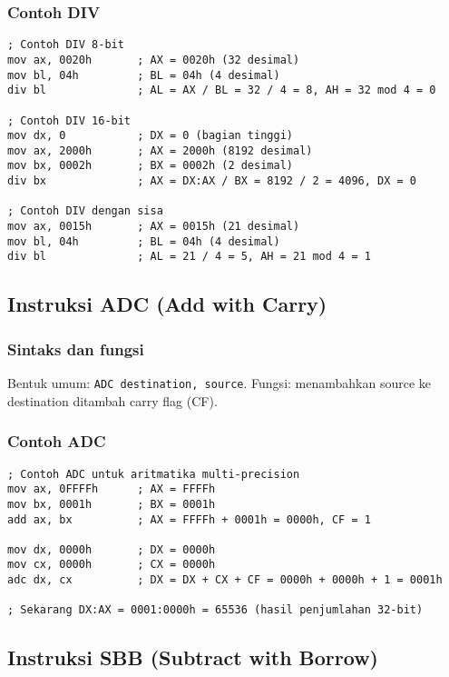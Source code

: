 \documentclass[../main.tex]{subfiles}
\begin{document}
            \subsubsection{Contoh DIV}
\begin{lstlisting}[language={[x86masm]Assembler}, caption=Instruksi DIV, label={lst:div-examples}]
; Contoh DIV 8-bit
mov ax, 0020h       ; AX = 0020h (32 desimal)
mov bl, 04h         ; BL = 04h (4 desimal)
div bl              ; AL = AX / BL = 32 / 4 = 8, AH = 32 mod 4 = 0

; Contoh DIV 16-bit
mov dx, 0           ; DX = 0 (bagian tinggi)
mov ax, 2000h       ; AX = 2000h (8192 desimal)
mov bx, 0002h       ; BX = 0002h (2 desimal)
div bx              ; AX = DX:AX / BX = 8192 / 2 = 4096, DX = 0

; Contoh DIV dengan sisa
mov ax, 0015h       ; AX = 0015h (21 desimal)
mov bl, 04h         ; BL = 04h (4 desimal)
div bl              ; AL = 21 / 4 = 5, AH = 21 mod 4 = 1
\end{lstlisting}

        \subsection{Instruksi ADC (Add with Carry)}
            \subsubsection{Sintaks dan fungsi}
Bentuk umum: \texttt{ADC destination, source}. Fungsi: menambahkan source ke destination ditambah carry flag (CF).

            \subsubsection{Contoh ADC}
\begin{lstlisting}[language={[x86masm]Assembler}, caption=Instruksi ADC, label={lst:adc-examples}]
; Contoh ADC untuk aritmatika multi-precision
mov ax, 0FFFFh      ; AX = FFFFh
mov bx, 0001h       ; BX = 0001h
add ax, bx          ; AX = FFFFh + 0001h = 0000h, CF = 1

mov dx, 0000h       ; DX = 0000h
mov cx, 0000h       ; CX = 0000h
adc dx, cx          ; DX = DX + CX + CF = 0000h + 0000h + 1 = 0001h

; Sekarang DX:AX = 0001:0000h = 65536 (hasil penjumlahan 32-bit)
\end{lstlisting}

        \subsection{Instruksi SBB (Subtract with Borrow)}
\end{document}
